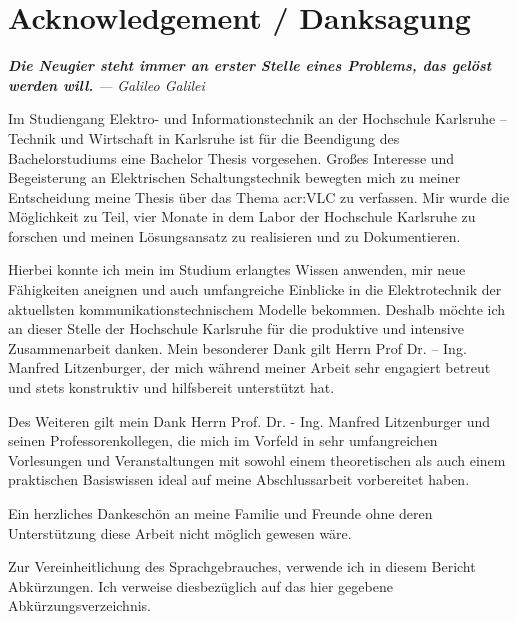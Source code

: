 \chapter*{Acknowledgement / Danksagung}

\textit{\textbf{Die Neugier steht immer an erster Stelle eines Problems, das gelöst
		werden will.}}
\textit{— Galileo Galilei}


Im Studiengang Elektro- und Informationstechnik an der Hochschule Karlsruhe – Technik und Wirtschaft in Karlsruhe ist für die Beendigung des Bachelorstudiums eine Bachelor Thesis vorgesehen. Großes Interesse und Begeisterung an Elektrischen Schaltungstechnik bewegten mich zu meiner Entscheidung meine Thesis über das Thema \gls{acr:VLC} zu verfassen. Mir wurde die Möglichkeit zu Teil, vier Monate in dem Labor der Hochschule Karlsruhe zu forschen und meinen Lösungsansatz zu realisieren und zu Dokumentieren.

Hierbei konnte ich mein im Studium erlangtes Wissen anwenden, mir neue Fähigkeiten aneignen und auch umfangreiche Einblicke in die Elektrotechnik der aktuellsten kommunikationstechnischem Modelle bekommen. Deshalb möchte ich an dieser Stelle der Hochschule Karlsruhe für die produktive und intensive Zusammenarbeit danken. Mein besonderer Dank gilt Herrn Prof Dr. – Ing. Manfred Litzenburger, der mich während meiner Arbeit sehr engagiert betreut und stets konstruktiv und hilfsbereit unterstützt hat.

Des Weiteren gilt mein Dank Herrn Prof. Dr. - Ing. Manfred Litzenburger und seinen Professorenkollegen, die mich im Vorfeld in sehr umfangreichen Vorlesungen und Veranstaltungen mit sowohl einem theoretischen als auch einem praktischen Basiswissen ideal auf meine Abschlussarbeit vorbereitet haben.

Ein herzliches Dankeschön an meine Familie und Freunde ohne deren Unterstützung
diese Arbeit nicht möglich gewesen wäre.

Zur Vereinheitlichung des Sprachgebrauches, verwende ich in diesem Bericht Abkürzungen. Ich verweise diesbezüglich auf das hier gegebene Abkürzungsverzeichnis.
